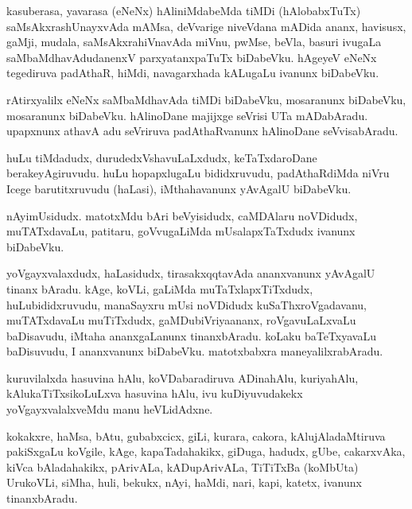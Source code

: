 \documentclass{article}
\begin{document}
\begin{mn}
kasuberasa, yavarasa (eNeNx) hAliniMdabeMda tiMDi (hAlobabxTuTx) saMsAkxrashUnayxvAda mAMsa, 
deVvarige niveVdana mADida ananx, havisusx, gaMji, mudala, saMsAkxrahiVnavAda miVnu, pwMse, 
beVla, basuri ivugaLa saMbaMdhavAdudanenxV parxyatanxpaTuTx biDabeVku. hAgeyeV eNeNx tegediruva 
padAthaR, hiMdi, navagarxhada kALugaLu ivanunx biDabeVku.
\end{mn}

\begin{mn}
rAtirxyalilx eNeNx saMbaMdhavAda tiMDi biDabeVku, mosaranunx biDabeVku, mosaranunx biDabeVku. 
hAlinoDane majijxge seVrisi UTa mADabAradu. upapxnunx athavA adu seVriruva padAthaRvanunx 
hAlinoDane seVvisabAradu.
\end{mn}

\begin{mn}
huLu tiMdadudx, durudedxVshavuLaLxdudx, keTaTxdaroDane berakeyAgiruvudu. huLu hopapxlugaLu 
bididxruvudu, padAthaRdiMda niVru Icege barutitxruvudu (haLasi), iMthahavanunx yAvAgalU biDabeVku.
\end{mn}

\begin{mn}
nAyimUsidudx. matotxMdu bAri beVyisidudx, caMDAlaru noVDidudx, muTATxdavaLu, patitaru, 
goVvugaLiMda mUsalapxTaTxdudx ivanunx biDabeVku.
\end{mn}

\begin{mn}
yoVgayxvalaxdudx, haLasidudx, tirasakxqqtavAda ananxvanunx yAvAgalU tinanx bAradu. kAge, koVLi, 
gaLiMda muTaTxlapxTiTxdudx, huLubididxruvudu, manaSayxru mUsi noVDidudx kuSaThxroVgadavanu, 
muTATxdavaLu muTiTxdudx, gaMDubiVriyaananx, roVgavuLaLxvaLu baDisavudu, iMtaha ananxgaLanunx 
tinanxbAradu. koLaku baTeTxyavaLu baDisuvudu, I ananxvanunx biDabeVku. matotxbabxra 
maneyalilxrabAradu.
\end{mn}

\begin{mn}
kuruvilalxda hasuvina hAlu, koVDabaradiruva ADinahAlu, kuriyahAlu, kAlukaTiTxsikoLuLxva hasuvina 
hAlu, ivu kuDiyuvudakekx yoVgayxvalalxveMdu manu heVLidAdxne.
\end{mn}

\begin{mn}
kokakxre, haMsa, bAtu, gubabxcicx, giLi, kurara, cakora, kAlujAladaMtiruva pakiSxgaLu koVgile,
kAge, kapaTadahakikx, giDuga, hadudx, gUbe, cakarxvAka, kiVca bAladahakikx, pArivALa, 
kADupArivALa, TiTiTxBa (koMbUta) UrukoVLi, siMha, huli, bekukx, nAyi, haMdi, nari, kapi, katetx, 
ivanunx tinanxbAradu.
\end{mn}
\end{document}

